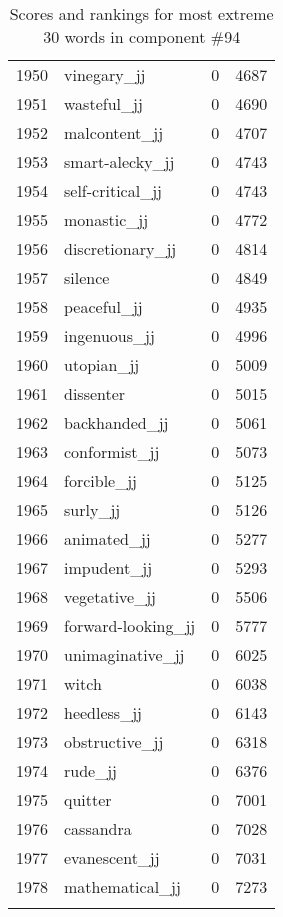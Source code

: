 \begin{longtable}[!htbp]{| rlr@{.}l |}
    1950 & vinegary\_jj & 0 & 4687 \\
    1951 & wasteful\_jj & 0 & 4690 \\
    1952 & malcontent\_jj & 0 & 4707 \\
    1953 & smart-alecky\_jj & 0 & 4743 \\
    1954 & self-critical\_jj & 0 & 4743 \\
    1955 & monastic\_jj & 0 & 4772 \\
    1956 & discretionary\_jj & 0 & 4814 \\
    1957 & silence & 0 & 4849 \\
    1958 & peaceful\_jj & 0 & 4935 \\
    1959 & ingenuous\_jj & 0 & 4996 \\
    1960 & utopian\_jj & 0 & 5009 \\
    1961 & dissenter & 0 & 5015 \\
    1962 & backhanded\_jj & 0 & 5061 \\
    1963 & conformist\_jj & 0 & 5073 \\
    1964 & forcible\_jj & 0 & 5125 \\
    1965 & surly\_jj & 0 & 5126 \\
    1966 & animated\_jj & 0 & 5277 \\
    1967 & impudent\_jj & 0 & 5293 \\
    1968 & vegetative\_jj & 0 & 5506 \\
    1969 & forward-looking\_jj & 0 & 5777 \\
    1970 & unimaginative\_jj & 0 & 6025 \\
    1971 & witch & 0 & 6038 \\
    1972 & heedless\_jj & 0 & 6143 \\
    1973 & obstructive\_jj & 0 & 6318 \\
    1974 & rude\_jj & 0 & 6376 \\
    1975 & quitter & 0 & 7001 \\
    1976 & cassandra & 0 & 7028 \\
    1977 & evanescent\_jj & 0 & 7031 \\
    1978 & mathematical\_jj & 0 & 7273 \\
    \hline
    \caption{Scores and rankings for most extreme 30 words in component \#94} \\
\end{longtable}

